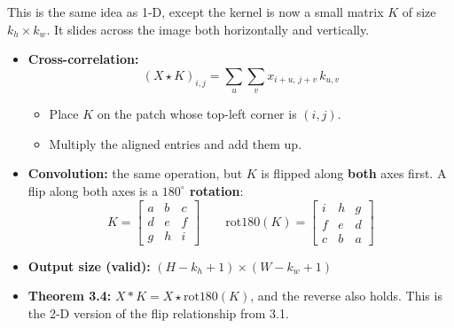 This is the same idea as 1-D, except the kernel is now a small matrix $K$ of size $k_h \times k_w$. It slides across the image both horizontally and vertically.

\begin{itemize}
  \item \textbf{Cross-correlation:}
  \[
  (X \star K)_{i,j} = \sum_{u}\sum_{v} x_{i+u,\, j+v}\, k_{u,v}
  \]
  \begin{itemize}
    \item Place $K$ on the patch whose top-left corner is $(i, j)$.
    \item Multiply the aligned entries and add them up.
  \end{itemize}
  \item \textbf{Convolution:} the same operation, but $K$ is flipped along \textbf{both} axes first. A flip along both axes is a \textbf{$180^\circ$ rotation}:
  \[
  K = \begin{bmatrix} a & b & c \\ d & e & f \\ g & h & i \end{bmatrix}
  \qquad
  \mathrm{rot180}(K) = \begin{bmatrix} i & h & g \\ f & e & d \\ c & b & a \end{bmatrix}
  \]
  \item \textbf{Output size (valid):} $(H - k_h + 1) \times (W - k_w + 1)$
  \item \textbf{Theorem 3.4:} $X * K = X \star \mathrm{rot180}(K)$, and the reverse also holds. This is the 2-D version of the flip relationship from 3.1.
\end{itemize}

